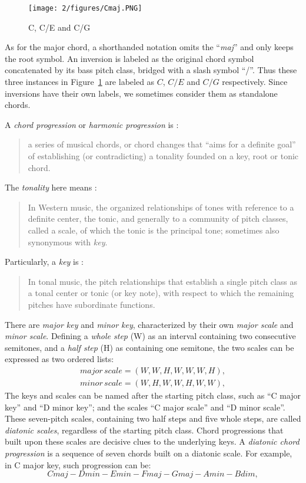 \begin{figure}[htb]
\centering
\texttt{[image: 2/figures/Cmaj.PNG]}
\caption{C, C/E and C/G}
\label{fig:2-cmaj}
\end{figure}
As for the major chord, a shorthanded notation omits the ``\textit{maj}'' and only keeps the root symbol. An inversion is labeled as the original chord symbol concatenated by its bass pitch class, bridged with a slash symbol ``/''. Thus these three instances in Figure~\ref{fig:2-cmaj} are labeled as $C$, $C/E$ and $C/G$ respectively. Since inversions have their own labels, we sometimes consider them as standalone chords.

A {\it chord progression} or {\it harmonic progression} is \cite{schonberg1989structural}:
\begin{quote}
a series of musical chords, or chord changes that ``aims for a definite goal'' of establishing (or contradicting) a tonality founded on a key, root or tonic chord.
\end{quote}
The {\it tonality} here means \cite{randel1999harvard}:
\begin{quote}
In Western music, the organized relationships of tones with reference to a definite center, the tonic, and generally to a community of pitch classes, called a scale, of which the tonic is the principal tone; sometimes also synonymous with {\it key}.
\end{quote}

Particularly, a {\it key} is \cite{randel1999harvard}:
\begin{quote}
In tonal music, the pitch relationships that establish a single pitch class as a tonal center or tonic (or key note), with respect to which the remaining pitches have subordinate functions.
\end{quote}
There are {\it major key} and {\it minor key}, characterized by their own {\it major scale} and {\it minor scale}. Defining a {\it whole step} (W) as an interval containing two consecutive semitones, and a {\it half step} (H) as containing one semitone, the two scales can be expressed as two ordered lists:
\begin{equation}
\begin{split}
\mathit{major\,scale=(W,W,H,W,W,W,H)},\\
\mathit{minor\,scale=(W,H,W,W,H,W,W)},
\end{split}
\end{equation}
The keys and scales can be named after the starting pitch class, such as ``C major key'' and ``D minor key''; and the scales ``C major scale'' and ``D minor scale''.  These seven-pitch scales, containing two half steps and five whole steps, are called {\it diatonic scales}, regardless of the starting pitch class. Chord progressions that built upon these scales are decisive clues to the underlying keys. A {\it diatonic chord progression} is a sequence of seven chords built on a diatonic scale. For example, in C major key, such progression can be:
\begin{equation}
\mathit{Cmaj - Dmin - Emin - Fmaj - Gmaj - Amin - Bdim,}
\end{equation}

